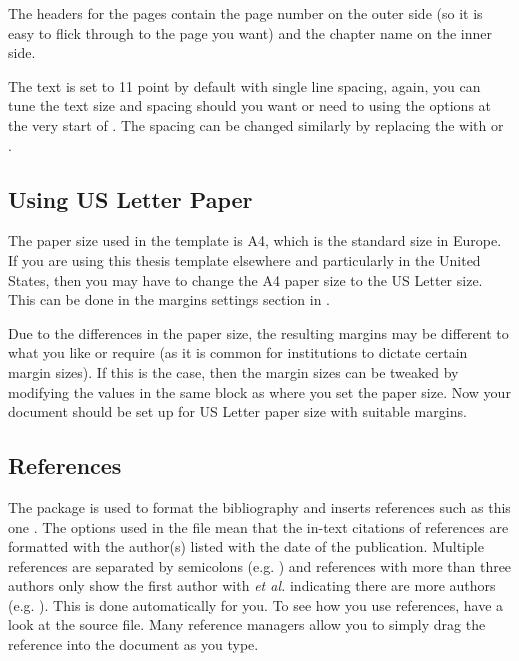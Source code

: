\documentclass[
12pt, %
english, %
doublespacing, %
nolistspacing, %
liststotoc, %
headsepline, %
chapterinoneline, %
openany, %
]{DoctoralThesis}\usepackage[]{graphicx}\usepackage[]{color}
\begin{document}
The headers for the pages contain the page number on the outer side (so it is easy to flick through to the page you want) and the chapter name on the inner side.

The text is set to 11 point by default with single line spacing, again, you can tune the text size and spacing should you want or need to using the options at the very start of . The spacing can be changed similarly by replacing the  with  or .

\subsection{Using US Letter Paper}

The paper size used in the template is A4, which is the standard size in Europe. If you are using this thesis template elsewhere and particularly in the United States, then you may have to change the A4 paper size to the US Letter size. This can be done in the margins settings section in .

Due to the differences in the paper size, the resulting margins may be different to what you like or require (as it is common for institutions to dictate certain margin sizes). If this is the case, then the margin sizes can be tweaked by modifying the values in the same block as where you set the paper size. Now your document should be set up for US Letter paper size with suitable margins.

\subsection{References}

The  package is used to format the bibliography and inserts references such as this one \parencite{Reference1}. The options used in the  file mean that the in-text citations of references are formatted with the author(s) listed with the date of the publication. Multiple references are separated by semicolons (e.g. \parencite{Reference2, Reference1}) and references with more than three authors only show the first author with \emph{et al.} indicating there are more authors (e.g. \parencite{Reference3}). This is done automatically for you. To see how you use references, have a look at the  source file. Many reference managers allow you to simply drag the reference into the document as you type.
\end{document}
